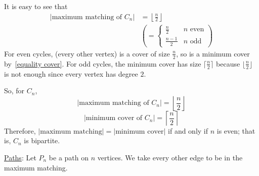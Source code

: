 It is easy to see that
\begin{align*}
    |\text{maximum matching of }C_n|
     & =\left\lfloor \frac{n}{2} \right\rfloor \\
     & \left( =
    \begin{cases}
            \frac{n}{2}   & n \text{ even} \\
            \frac{n-1}{2} & n \text{ odd}
        \end{cases}\right)
\end{align*}
For even cycles, (every other vertex) is a cover of size $ \frac{n}{2} $, so
is a minimum cover by~\ref{equality cover}.
For odd cycles, the minimum cover has size $ \lceil \frac{n}{2} \rceil $
because $ \lfloor \frac{n}{2} \rfloor  $ is not enough since every vertex has
degree $ 2 $.

So, for $ C_n $,
\[ |\text{maximum matching of }C_n|=\left\lfloor \frac{n}{2} \right\rfloor \]
\[ |\text{minimum cover of }C_n|=\left\lceil \frac{n}{2} \right\rceil \]
Therefore, $ |\text{maximum matching}|=|\text{minimum cover}| $ if and only if
$ n $ is even; that is, $ C_n $ is bipartite.

\underline{Paths}: Let $ P_n $ be a path on $ n $ vertices. We take
every other edge to be in the maximum matching.

